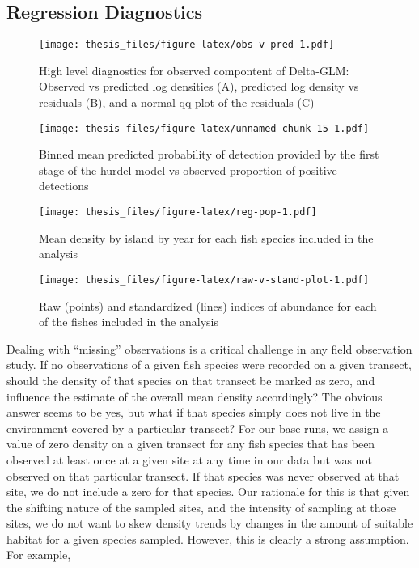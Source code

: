 \documentclass[twoside,12pt,final]{ucthesis-CA2012}
\begin{document}
\begin{ucmainmatter}
\subsection{Regression Diagnostics}\label{regression-diagnostics}
\begin{figure}
\centering
\texttt{[image: thesis\_files/figure-latex/obs-v-pred-1.pdf]}
\caption{\label{fig:obs-v-pred}High level diagnostics for observed
compontent of Delta-GLM: Observed vs predicted log densities (A),
predicted log density vs residuals (B), and a normal qq-plot of the
residuals (C)}
\end{figure}
\begin{figure}
\centering
\texttt{[image: thesis\_files/figure-latex/unnamed-chunk-15-1.pdf]}
\caption{\label{fig:unnamed-chunk-15}Binned mean predicted probability of
detection provided by the first stage of the hurdel model vs observed
proportion of positive detections}
\end{figure}
\begin{figure}
\centering
\texttt{[image: thesis\_files/figure-latex/reg-pop-1.pdf]}
\caption{\label{fig:reg-pop}Mean density by island by year for each fish
species included in the analysis}
\end{figure}
\begin{figure}
\centering
\texttt{[image: thesis\_files/figure-latex/raw-v-stand-plot-1.pdf]}
\caption{\label{fig:raw-v-stand-plot}Raw (points) and standardized (lines)
indices of abundance for each of the fishes included in the analysis}
\end{figure}
Dealing with ``missing'' observations is a critical challenge in any
field observation study. If no observations of a given fish species were
recorded on a given transect, should the density of that species on that
transect be marked as zero, and influence the estimate of the overall
mean density accordingly? The obvious answer seems to be yes, but what
if that species simply does not live in the environment covered by a
particular transect? For our base runs, we assign a value of zero
density on a given transect for any fish species that has been observed
at least once at a given site at any time in our data but was not
observed on that particular transect. If that species was never observed
at that site, we do not include a zero for that species. Our rationale
for this is that given the shifting nature of the sampled sites, and the
intensity of sampling at those sites, we do not want to skew density
trends by changes in the amount of suitable habitat for a given species
sampled. However, this is clearly a strong assumption. For example,

\end{ucmainmatter}
\end{document}
